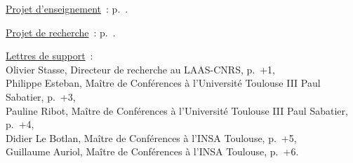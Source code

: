 \vspace{.08in}

\underline{Projet d'enseignement}~: p.~\pageref{projet-enseignement}.\\

\vspace{.01in}

\underline{Projet de recherche}~: p.~\pageref{projet-recherche}.\\

\vspace{.01in}

\underline{Lettres de support}~:\\
\hspace*{.2in}Olivier Stasse, Directeur de recherche au LAAS-CNRS, p.~\the\numexpr{}+1\relax,\\
\hspace*{.2in}Philippe Esteban, Maître de Conférences à l'Université Toulouse III Paul Sabatier, p.~\the\numexpr{}+3\relax,\\
\hspace*{.2in}Pauline Ribot, Maître de Conférences à l'Université Toulouse III Paul Sabatier, p.~\the\numexpr{}+4\relax,\\
\hspace*{.2in}Didier Le Botlan, Maître de Conférences à l'INSA Toulouse, p.~\the\numexpr{}+5\relax,\\
\hspace*{.2in}Guillaume Auriol, Maître de Conférences à l'INSA Toulouse, p.~\the\numexpr{}+6\relax.\\